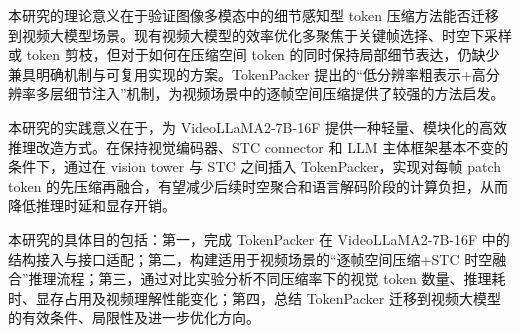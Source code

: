 本研究的理论意义在于验证图像多模态中的细节感知型 token 压缩方法能否迁移到视频大模型场景。现有视频大模型的效率优化多聚焦于关键帧选择、时空下采样或 token 剪枝，但对于如何在压缩空间 token 的同时保持局部细节表达，仍缺少兼具明确机制与可复用实现的方案。TokenPacker 提出的“低分辨率粗表示+高分辨率多层细节注入”机制，为视频场景中的逐帧空间压缩提供了较强的方法启发。

本研究的实践意义在于，为 VideoLLaMA2-7B-16F 提供一种轻量、模块化的高效推理改造方式。在保持视觉编码器、STC connector 和 LLM 主体框架基本不变的条件下，通过在 vision tower 与 STC 之间插入 TokenPacker，实现对每帧 patch token 的先压缩再融合，有望减少后续时空聚合和语言解码阶段的计算负担，从而降低推理时延和显存开销。

本研究的具体目的包括：第一，完成 TokenPacker 在 VideoLLaMA2-7B-16F 中的结构接入与接口适配；第二，构建适用于视频场景的“逐帧空间压缩+STC 时空融合”推理流程；第三，通过对比实验分析不同压缩率下的视觉 token 数量、推理耗时、显存占用及视频理解性能变化；第四，总结 TokenPacker 迁移到视频大模型的有效条件、局限性及进一步优化方向。
